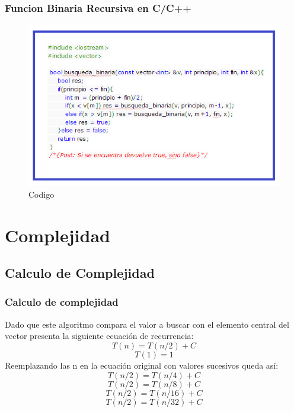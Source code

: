 \documentclass{beamer}
\begin{document}
		\begin{frame}
			\frametitle{Funcion Binaria Recursiva en C/C++}
			\begin{figure}
  				\centering
    			           \includegraphics[scale=0.6]{CodigoC.png}
  				\caption{Codigo}
  				\label{fig:lls}
			\end{figure}
			
		\end{frame}

		
\section{Complejidad}

	\subsection{Calculo de Complejidad}

		\begin{frame}
			\frametitle{Calculo de complejidad}
			Dado que este algoritmo compara el valor a buscar con el elemento central del vector presenta la siguiente ecuación de recurrencia:
			\begin{equation}
					T(n) = T(n/2) + C
				\end{equation}
			\begin{equation}
					T(1) = 1
				\end{equation}
Reemplazando las n en la ecuación original con valores sucesivos queda así:
             \begin{equation}
					T(n/2) = T(n/4) + C
				\end{equation}
				  \begin{equation}
					T(n/2) = T(n/8) + C
				\end{equation}
				  \begin{equation}
					T(n/2) = T(n/16) + C
				\end{equation}
				  \begin{equation}
					T(n/2) = T(n/32) + C
				\end{equation}
		\end{frame}
\end{document}

